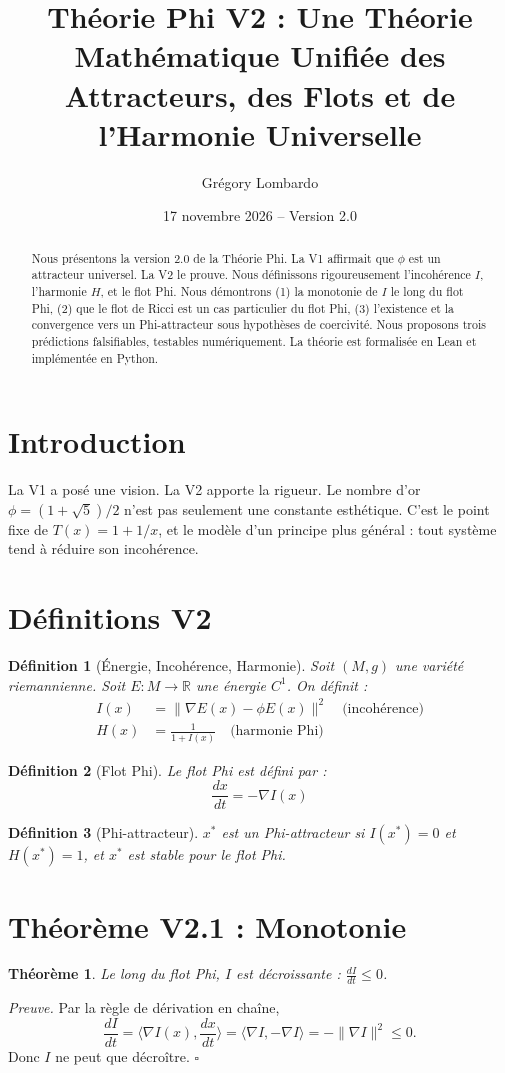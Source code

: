\documentclass[11pt,a4paper]{article}
\title{Théorie Phi V2 : Une Théorie Mathématique Unifiée des Attracteurs, des Flots et de l'Harmonie Universelle}
\author{Grégory Lombardo}
\date{17 novembre 2026 -- Version 2.0}
\newtheorem{definition}{Définition}[section]
\newtheorem{theorem}{Théorème}[section]
\begin{document}
\maketitle
\begin{abstract}
Nous présentons la version 2.0 de la Théorie Phi. La V1 affirmait que $\phi$ est un attracteur universel. La V2 le prouve. Nous définissons rigoureusement l'incohérence $I$, l'harmonie $H$, et le flot Phi. Nous démontrons (1) la monotonie de $I$ le long du flot Phi, (2) que le flot de Ricci est un cas particulier du flot Phi, (3) l'existence et la convergence vers un Phi-attracteur sous hypothèses de coercivité. Nous proposons trois prédictions falsifiables, testables numériquement. La théorie est formalisée en Lean et implémentée en Python.
\end{abstract}

\section{Introduction}
La V1 a posé une vision. La V2 apporte la rigueur. Le nombre d'or $\phi = (1+\sqrt{5})/2$ n'est pas seulement une constante esthétique. C'est le point fixe de $T(x)=1+1/x$, et le modèle d'un principe plus général : tout système tend à réduire son incohérence.

\section{Définitions V2}
\begin{definition}[Énergie, Incohérence, Harmonie]
Soit $(M,g)$ une variété riemannienne. Soit $E:M\to\mathbb{R}$ une énergie $C^1$. On définit :
\begin{align*}
I(x) &= \|\nabla E(x) - \phi E(x)\|^2 \quad \text{(incohérence)} \\
H(x) &= \frac{1}{1+I(x)} \quad \text{(harmonie Phi)}
\end{align*}
\end{definition}
\begin{definition}[Flot Phi]
Le flot Phi est défini par :
\[
\frac{dx}{dt} = -\nabla I(x)
\]
\end{definition}
\begin{definition}[Phi-attracteur]
$x^*$ est un Phi-attracteur si $I(x^*)=0$ et $H(x^*)=1$, et $x^*$ est stable pour le flot Phi.
\end{definition}

\section{Théorème V2.1 : Monotonie}
\begin{theorem}
Le long du flot Phi, $I$ est décroissante : $\frac{dI}{dt} \leq 0$.
\end{theorem}
\textit{Preuve.} Par la règle de dérivation en chaîne,
\[
\frac{dI}{dt} = \langle \nabla I(x), \frac{dx}{dt}\rangle = \langle \nabla I, -\nabla I\rangle = -\|\nabla I\|^2 \leq 0.
\]
Donc $I$ ne peut que décroître. $\square$
\end{document}
